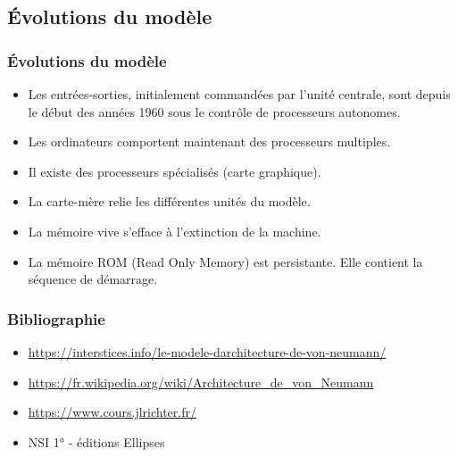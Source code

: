 \documentclass[svgnames,11pt]{beamer}
\begin{document}
\subsection{Évolutions du modèle}
\begin{frame}
    \frametitle{Évolutions du modèle}

\begin{itemize}
    \item<1-> Les entrées-sorties, initialement commandées par l’unité centrale, sont depuis le début des années 1960 sous le contrôle de processeurs autonomes.
    \item<2-> Les ordinateurs comportent maintenant des processeurs multiples.
    \item<3-> Il existe des processeurs spécialisés (carte graphique).
    \item<4-> La carte-mère relie les différentes unités du modèle.
    \item<5-> La mémoire vive s'efface à l'extinction de la machine.
    \item<6-> La mémoire ROM (Read Only Memory) est persistante. Elle contient la séquence de démarrage.
\end{itemize}

\end{frame}
\begin{frame}
    \frametitle{Bibliographie}
    {\small
    \begin{itemize}
        \item \url{https://interstices.info/le-modele-darchitecture-de-von-neumann/}
        \item \url{https://fr.wikipedia.org/wiki/Architecture_de_von_Neumann}
        \item \url{https://www.cours.jlrichter.fr/}
        \item NSI 1° - éditions Ellipses
    \end{itemize}
    }
\end{frame}
\end{document}
